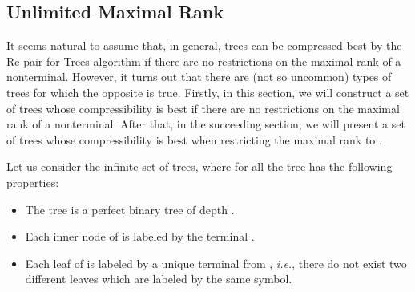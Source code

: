 \documentclass[12pt]{llncs}
\newcommand{\hairsp}{\hspace{1pt}}\newcommand{\TODO}{\textcolor{red}{\bf TODO!}\xspace}
\newcommand{\ie}{\mbox{\textit{i.\hairsp{}e.}}\xspace}
\begin{document}
\subsection{Unlimited Maximal Rank}\label{sec:observations}

It seems natural to assume that, in general, trees can be compressed best by the Re-pair for Trees algorithm if there are no restrictions on the maximal rank of a nonterminal. However, it turns out that there are (not so uncommon) types of trees for which the opposite is true. Firstly, in this section, we will construct a set of trees whose compressibility is best if there are no restrictions on the maximal rank of a nonterminal. After that, in the succeeding section, we will present a set of trees whose compressibility is best when restricting the maximal rank to .

Let us consider the infinite set  of trees, where for all  the tree  has the following properties:
\begin{itemize}
	\item The tree  is a perfect binary tree of depth .
	\item Each inner node of  is labeled by the terminal .
	\item Each leaf of  is labeled by a unique terminal from , \ie, there do not exist two different leaves which are labeled by the same symbol.
\end{itemize}
\end{document}

